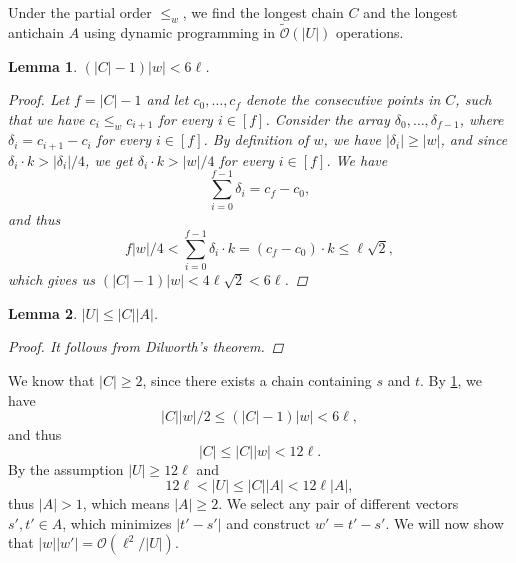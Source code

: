 \documentclass[11pt]{article}
\renewcommand{\O}{\mathcal{O}}
\newcommand{\tO}{\tilde{\mathcal{O}}}
\theoremstyle{plain}
\newtheorem{lemma}{Lemma}
\theoremstyle{definition}
\theoremstyle{remark}
\begin{document}
Under the partial order $\le_w$, we find the longest chain $C$ and the longest antichain $A$ using dynamic programming in $\tO(|U|)$ operations.


\begin{lemma}\label{C_ineq}
	$(|C| - 1) |w| < 6\ell$. 
	\begin{proof}
		Let $f = |C| - 1$ and
		let $c_0, \dots, c_{f}$ denote the consecutive points in $C$, such that we have $c_i \le_w c_{i + 1}$ for every $i \in [f]$.
		Consider the array $\delta_0, \dots, \delta_{f - 1}$, where $\delta_i = c_{i + 1} - c_i$ for every $i \in [f]$.
		By definition of $w$, we have $|\delta_i| \ge |w|$,
		and since $\delta_i \cdot k > |\delta_i| / 4$, we get
		$\delta_i \cdot k > |w| / 4$ for every $i \in [f]$.
		We have
		$$ \sum_{i = 0}^{f - 1} \delta_i = c_f - c_0,$$
		and thus
		$$ f|w| / 4 < \sum_{i = 0}^{f - 1} \delta_i \cdot k = (c_f - c_0) \cdot k \le \ell \sqrt{2}, $$
		which gives us $(|C| - 1)|w| < 4\ell \sqrt{2} < 6\ell$.
	\end{proof}
\end{lemma}

\begin{lemma}\label{dilworth}
	$|U| \le |C| |A|$.
	\begin{proof}
		It follows from Dilworth's theorem.
	\end{proof}
\end{lemma}

We know that $|C| \ge 2$, since there exists a chain containing $s$ and $t$.
By \cref{C_ineq}, we have
$$ |C||w| / 2 \le (|C| - 1)|w| < 6\ell, $$
and thus
$$ |C| \le |C||w| < 12\ell. $$
By the assumption $|U| \ge 12\ell$ and 
$$12 \ell < |U| \le |C| |A| < 12\ell|A|,$$
thus $|A| > 1$, which means $|A| \ge 2$.
We select any pair of different vectors $s', t' \in A$, which minimizes $|t' - s'|$ and construct $w' = t' - s'$.
We will now show that $|w||w'| = \O(\ell^2 / |U|)$.
\end{document}
